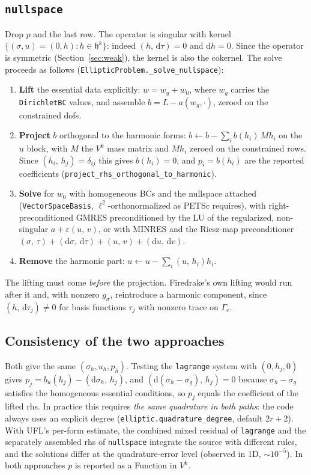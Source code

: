 \documentclass[11pt]{article}
\newcommand{\dd}{\mathrm{d}}
\newcommand{\Hspace}{\mathfrak{h}}
\newcommand{\code}[1]{\texttt{#1}}
\newcommand{\ip}[2]{\left(#1,\,#2\right)}
\theoremstyle{remark}
\begin{document}
\subsection{\code{nullspace}}

Drop $p$ and the last row. The operator is singular with kernel
$\{(\sigma,u)=(0,h):h\in\Hspace^k\}$: indeed $\ip{h}{\dd\tau}=0$ and $\dd h=0$. Since the operator is
symmetric (Section~\ref{sec:weak}), the kernel is also the cokernel. The solve proceeds as follows
(\code{EllipticProblem.\_solve\_nullspace}):
\begin{enumerate}
\item \textbf{Lift} the essential data explicitly: $w=w_g+w_0$, where $w_g$ carries the
  \code{DirichletBC} values, and assemble $b=L-a(w_g,\cdot)$, zeroed on the constrained dofs.
\item \textbf{Project} $b$ orthogonal to the harmonic forms: $b\leftarrow b-\sum_i b(h_i)\,Mh_i$ on
  the $u$ block, with $M$ the $V^k$ mass matrix and $Mh_i$ zeroed on the constrained rows. Since
  $\ip{h_i}{h_j}=\delta_{ij}$ this gives $b(h_i)=0$, and $p_i=b(h_i)$ are the reported coefficients
  (\code{project\_rhs\_orthogonal\_to\_harmonic}).
\item \textbf{Solve} for $w_0$ with homogeneous BCs and the nullspace attached
  (\code{VectorSpaceBasis}, $\ell^2$-orthonormalized as PETSc requires), with right-preconditioned
  GMRES preconditioned by the LU of the regularized, non-singular $a+\varepsilon\ip{u}{v}$, or with
  MINRES and the Riesz-map preconditioner $\ip{\sigma}{\tau}+\ip{\dd\sigma}{\dd\tau}+\ip{u}{v}+\ip{\dd u}{\dd v}$.
\item \textbf{Remove} the harmonic part: $u\leftarrow u-\sum_i\ip{u}{h_i}h_i$.
\end{enumerate}
The lifting must come \emph{before} the projection. Firedrake's own lifting would run after it and,
with nonzero $g_\sigma$, reintroduce a harmonic component, since $\ip{h}{\dd\tau_j}\neq0$ for basis
functions $\tau_j$ with nonzero trace on $\Gamma_e$.

\subsection{Consistency of the two approaches}

Both give the same $(\sigma_h,u_h,p_h)$. Testing the \code{lagrange} system with $(0,h_j,0)$ gives
$p_j = b_u(h_j)-\ip{\dd\sigma_h}{h_j}$, and $\ip{\dd(\sigma_h-\sigma_g)}{h_j}=0$ because
$\sigma_h-\sigma_g$ satisfies the homogeneous essential conditions, so $p_j$ equals the coefficient of
the lifted rhs. In practice this requires \emph{the same quadrature in both paths}: the code always uses
an explicit degree (\code{elliptic.quadrature\_degree}, default $2r+2$). With UFL's per-form estimate,
the combined mixed residual of \code{lagrange} and the separately assembled rhs of \code{nullspace}
integrate the source with different rules, and the solutions differ at the quadrature-error level
(observed in 1D, $\sim10^{-5}$). In both approaches $p$ is reported as a Function in $V^k$.
\end{document}
